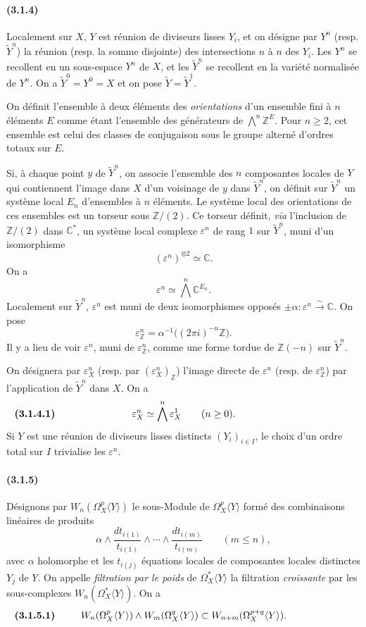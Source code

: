 \documentclass[10pt]{article}
\newcommand{\C}{\mathbb C}
\newcommand{\Z}{\mathbb Z}
\newcommand{\iso}{\xrightarrow{\sim}}
\begin{document}
\paragraph{(3.1.4)} Localement sur $X$, $Y$ est réunion de diviseurs lisses $Y_i$, et on désigne par $Y^n$ (resp. $\widetilde Y^n$) la réunion (resp. la somme disjointe) des intersections $n$ à $n$ des $Y_i$. Les $Y^n$ se recollent en un sous-espace $Y^n$ de $X$, et les $\widetilde Y^n$ se recollent en la variété normalisée de $Y^n$. On a $\widetilde Y^0=Y^0=X$ et on pose $\widetilde Y=\widetilde Y^1$.

On définit l'ensemble à deux éléments des \emph{orientations} d'un ensemble fini à $n$ éléments $E$ comme étant l'ensemble des générateurs de $\bigwedge^n\Z^E$. Pour $n\ge2$, cet ensemble est celui des classes de conjugaison sous le groupe alterné d'ordres totaux sur $E$.

Si, à chaque point $y$ de $\widetilde Y^n$, on associe l'ensemble des $n$ composantes locales de $Y$ qui contiennent l'image dans $X$ d'un voisinage de $y$ dans $\widetilde Y^n$, on définit sur $\widetilde Y^n$ un système local $E_n$ d'ensembles à $n$ éléments. Le système local des orientations de ces ensembles est un torseur sous $\Z/(2)$. Ce torseur définit, \emph{via} l'inclusion de $\Z/(2)$ dans $\C^*$, un système local complexe $\varepsilon^n$ de rang $1$ sur $\widetilde Y^n$, muni d'un isomorphisme
\[
(\varepsilon^n)^{\otimes2}\simeq\C.
\]
On a
\[
\varepsilon^n\simeq\bigwedge^n\C^{E_n}.
\]
Localement sur $\widetilde Y^n$, $\varepsilon^n$ est muni de deux isomorphismes opposés $\pm\alpha:\varepsilon^n\iso\C$. On pose
\[
\varepsilon_\Z^n=\alpha^{-1}\bigl((2\pi i)^{-n}\Z\bigr).
\]
Il y a lieu de voir $\varepsilon^n$, muni de $\varepsilon_\Z^n$, comme une forme tordue de $\Z(-n)$ sur $\widetilde Y^n$.

On désignera par $\varepsilon_X^n$ (resp. par $(\varepsilon_X^n)_\Z$) l'image directe de $\varepsilon^n$ (resp. de $\varepsilon_\Z^n$) par l'application de $\widetilde Y^n$ dans $X$. On a
\[
\makebox[\textwidth][s]{\textbf{(3.1.4.1)}\hfill$\displaystyle \varepsilon_X^n\simeq\bigwedge^n\varepsilon_X^1\qquad(n\ge0).$\hfill\phantom{\textbf{(3.1.4.1)}}}
\]
Si $Y$ est une réunion de diviseurs lisses distincts $(Y_i)_{i\in I}$, le choix d'un ordre total sur $I$ trivialise les $\varepsilon^n$.

\paragraph{(3.1.5)} Désignons par $W_n(\Omega_X^p\langle Y\rangle)$ le sous-Module de $\Omega_X^p\langle Y\rangle$ formé des combinaisons linéaires de produits
\[
\alpha\wedge\frac{dt_{i(1)}}{t_{i(1)}}\wedge\cdots\wedge
\frac{dt_{i(m)}}{t_{i(m)}}\qquad(m\le n),
\]
avec $\alpha$ holomorphe et les $t_{i(j)}$ équations locales de composantes locales distinctes $Y_j$ de $Y$. On appelle \emph{filtration par le poids} de $\Omega_X^*\langle Y\rangle$ la filtration \emph{croissante} par les sous-complexes $W_n(\Omega_X^*\langle Y\rangle)$. On a
\[
\makebox[\textwidth][s]{\textbf{(3.1.5.1)}\hfill$\displaystyle W_n(\Omega_X^p\langle Y\rangle)\wedge W_m(\Omega_X^q\langle Y\rangle)\subset W_{n+m}(\Omega_X^{p+q}\langle Y\rangle).$\hfill\phantom{\textbf{(3.1.5.1)}}}
\]
\end{document}
